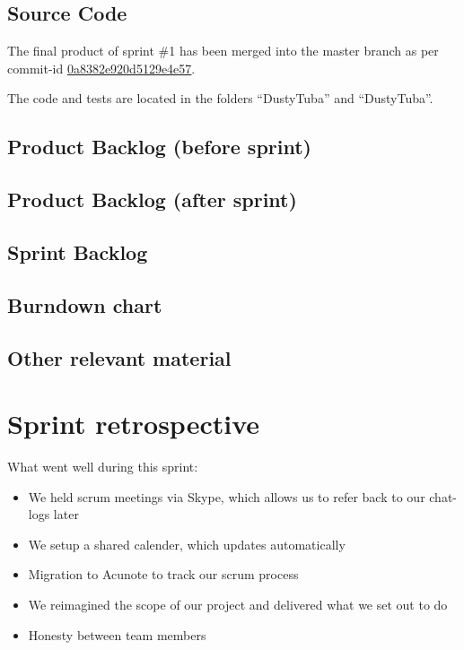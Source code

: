 \documentclass[a4paper,11pt]{article}
\begin{document}

\subsection{Source Code}
The final product of sprint \#1 has been merged into the master branch as per commit-id  \href{https://github.com/omegahm/DBP2P/commit/0a8382e920d5129e4e57a7e54018b8769dcb3273}{0a8382e920d5129e4e57}.

The code and tests are located in the folders ``DustyTuba'' and ``DustyTuba''.

\subsection{Product Backlog (before sprint)}

\subsection{Product Backlog (after sprint)}

\subsection{Sprint Backlog}

\subsection{Burndown chart}

\subsection{Other relevant material}


\section{Sprint retrospective}


What went well during this sprint:

\begin{itemize}
	\item We held scrum meetings via Skype, which allows us to refer back to our chat-logs later
	\item We setup a shared calender, which updates automatically
	\item Migration to Acunote to track our scrum process
	\item We reimagined the scope of our project and delivered what we set out to do
	\item Honesty between team members
\end{itemize}
\end{document}
